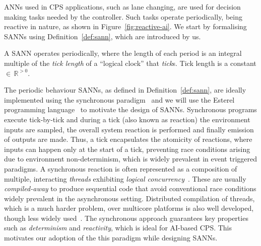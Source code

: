 \acp{ANN} used in \ac{CPS} applications, such as lane changing, are used for decision making tasks 
needed by the controller. Such tasks operate periodically, being reactive in nature,
as shown in Figure~\ref{fig:reactive-ai}. We start by formalising \acp{SANN} using Definition~\ref{def:sann},
which are introduced by us. 

\begin{definition}
	\label{def:sann}
	A \acf{SANN} operates periodically, where the length of each period is 
	an integral multiple of the \emph{tick length} of a ``logical clock'' that \emph{tick}s. Tick length
	is a constant $\in \, \mathbb{R}^{>0}$.
\end{definition}

The periodic behaviour \acp{SANN}, as defined in Definition~\ref{def:sann}, are ideally implemented using the synchronous 
paradigm~\cite{benveniste2003synchronous} and we will use the Esterel programming language~\cite{berry2000foundations} 
to motivate the design of \acp{SANN}. Synchronous programs execute tick-by-tick and during a tick (also known as reaction) the
environment inputs are sampled, the overall system reaction is performed and finally emission of outputs are made. Thus, a tick encapsulates 
the atomicity of reactions, where inputs can happen only at the start of a tick, preventing race conditions arising due to environment 
non-determinism, which is widely prevalent in event triggered paradigms. A synchronous reaction is often represented as a composition of 
multiple, interacting \emph{threads} exhibiting \emph{logical concurrency}~\cite{benveniste2003synchronous}. 
These are usually \emph{compiled-away} to produce sequential code 
that avoid conventional race conditions widely prevalent in the asynchronous setting. Distributed compilation of threads, which is a much harder problem, over
multicore platforms is also well developed, though less widely used~\cite{yuan2011compiling}. The synchronous approach guarantees
key properties such as \emph{determinism} and \emph{reactivity}, which is ideal for AI-based CPS. This motivates 
our adoption of the this paradigm while designing \acp{SANN}.


